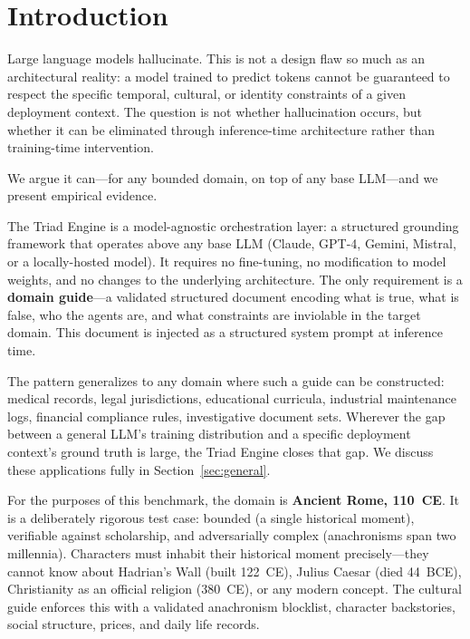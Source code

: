 \documentclass[11pt,a4paper]{article}
\begin{document}
\begin{abstract}
On adversarial pressure tests (20 leading questions asserting false premises),
raw Claude~4.6 accepts 5/20 falsehoods (25\% hallucination) versus Triad's
1/20 (5\%). On cross-character factual consistency (10 objective facts
$\times$ 6 independent character personas), raw Claude~4.6 shows 0\%
agreement on ``Who is the current emperor?'' while Triad achieves 100\%
across all personas. All benchmarks, question sets, and result JSON are
open-sourced.
\end{abstract}

\section{Introduction}

Large language models hallucinate. This is not a design flaw so much as an
architectural reality: a model trained to predict tokens cannot be guaranteed
to respect the specific temporal, cultural, or identity constraints of a given
deployment context. The question is not whether hallucination occurs, but
whether it can be eliminated through inference-time architecture rather than
training-time intervention.

We argue it can---for any bounded domain, on top of any base LLM---and we
present empirical evidence.

The Triad Engine is a model-agnostic orchestration layer: a structured
grounding framework that operates above any base LLM (Claude, GPT-4, Gemini,
Mistral, or a locally-hosted model). It requires no fine-tuning, no
modification to model weights, and no changes to the underlying architecture.
The only requirement is a \textbf{domain guide}---a validated structured
document encoding what is true, what is false, who the agents are, and what
constraints are inviolable in the target domain. This document is injected as
a structured system prompt at inference time.

The pattern generalizes to any domain where such a guide can be constructed:
medical records, legal jurisdictions, educational curricula, industrial
maintenance logs, financial compliance rules, investigative document sets.
Wherever the gap between a general LLM's training distribution and a specific
deployment context's ground truth is large, the Triad Engine closes that gap.
We discuss these applications fully in Section~\ref{sec:general}.

For the purposes of this benchmark, the domain is \textbf{Ancient Rome,
110~CE}. It is a deliberately rigorous test case: bounded (a single historical
moment), verifiable against scholarship, and adversarially complex (anachronisms
span two millennia). Characters must inhabit their historical moment
precisely---they cannot know about Hadrian's Wall (built 122~CE), Julius Caesar
(died 44~BCE), Christianity as an official religion (380~CE), or any modern
concept. The cultural guide enforces this with a validated anachronism
blocklist, character backstories, social structure, prices, and daily life
records.
\end{document}
